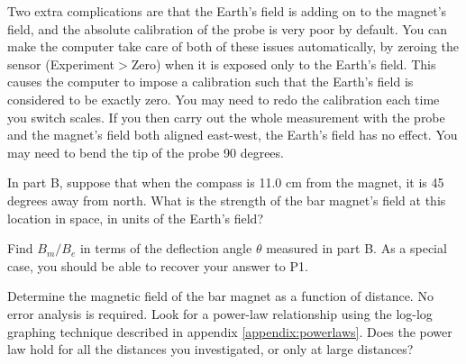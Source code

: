 Two extra complications are that the Earth's field is adding on to the magnet's field, and the
absolute calibration of the probe is very poor by default.  
You can make the computer take care of both of these issues automatically, by zeroing the
sensor (Experiment$>$Zero) when it is exposed only to the Earth's field. This causes the
computer to impose a calibration such that the Earth's field is considered to be exactly zero. You may need
to redo the calibration each time you switch scales. If you then carry out the whole measurement with the
probe and the magnet's field both aligned east-west, the Earth's field has no effect.
You may need to bend the tip of the probe 90 degrees.

\prelab

\prelabquestion  In part B, suppose that
when the compass is 11.0 cm from the magnet, it is
45 degrees away from north. What is
the strength of the bar magnet's field at this location in space,
in units of the Earth's field?

\prelabquestion Find $B_m/B_e$ in terms of the deflection angle $\theta$ measured in part B. As a special
case, you should be able to recover your answer to P1.

\analysis

Determine the magnetic
field of the bar magnet as a function of distance. No error analysis is required. 
Look for a power-law relationship using the log-log graphing technique described in 
appendix \ref{appendix:powerlaws}. Does the power law hold for
all the distances you investigated, or only at large distances?
